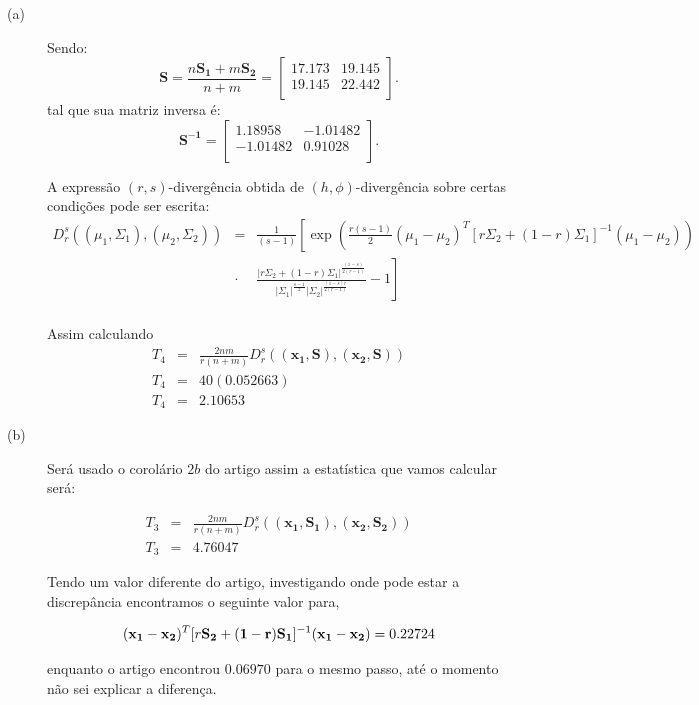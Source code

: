 \documentclass[12pt,a4paper]{article}
\begin{document}
\begin{description}
\item[(a)] Sendo:
$$
		\mathbf{S}=\frac{n\mathbf{S_1}+m\mathbf{S_2}}{n+m} = \left[
\begin{array}{cc}
	 17.173  & 19.145   \\
         19.145  & 22.442   \\
\end{array}
\right].
$$
tal que sua matriz inversa é:
$$
		\mathbf{S^{-1}} = \left[
\begin{array}{cc}
	 1.18958  & -1.01482   \\
        -1.01482  & 0.91028   \\
\end{array}
\right].
$$

		A expressão $(r,s)$-divergência obtida de $(h,\phi)$-divergência sobre certas condições pode ser escrita:
\begin{equation}\label{eqn84}
\begin{array}{ccl}
	D_r^s((\mu_1,\Sigma_1),(\mu_2,\Sigma_2))&=&\frac{1}{(s-1)}\left[\exp\left(\frac{r(s-1)}{2}(\mu_1-\mu_2)^{T}[r\Sigma_2+(1-r)\Sigma_1]^{-1}(\mu_1-\mu_2) \right)\right. \\
	&\cdot&\left.\frac{|r\Sigma_2+(1-r)\Sigma_1|^{\frac{(1-s)}{2(r-1)}}}{|\Sigma_1|^{\frac{s-1}{2}}|\Sigma_2|^{\frac{(1-s)r}{2(r-1)}}}-1\right]  \\
\end{array}
\end{equation}

Assim calculando
\begin{equation}\label{eqn85}
\begin{array}{ccc}
	T_4&=&\frac{2nm}{r(n+m)}D_r^s((\mathbf{x_1}, \mathbf{S}),(\mathbf{x_2}, \mathbf{S})) \\
	T_4&=&40(0.052663) \\
	T_4&=&2.10653
\end{array}
\end{equation}
\item[(b)] Será usado o corolário $2b$ do artigo \cite{salicru_pardo_1994} assim a estatística que vamos calcular será:

\begin{equation}\label{eqn86}
\begin{array}{ccc}
	T_3&=&\frac{2nm}{r(n+m)}D_r^s((\mathbf{x_1}, \mathbf{S_1}),(\mathbf{x_2}, \mathbf{S_2})) \\
	T_3&=&4.76047
\end{array}
\end{equation}

Tendo um valor diferente do artigo, investigando onde pode estar a discrepância encontramos o seguinte valor para, 

\begin{equation}\label{eqn87}
	(\mathbf{x_1}-\mathbf{x_2})^T [r\mathbf{S_2+(1-r)S_1}]^{-1}(\mathbf{x_1-x_2})= 0.22724\\
\end{equation}

enquanto o artigo encontrou $0.06970$ para o mesmo passo, até o momento não sei explicar a diferença.

\end{description}
\end{document}
